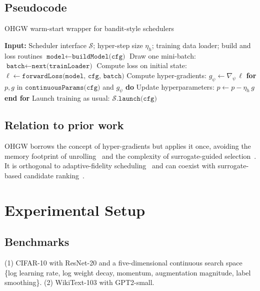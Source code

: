 \documentclass{article} %
\begin{document}
\subsection{Pseudocode}
\begin{algorithm}
\caption{OHGW warm-start wrapper for bandit-style schedulers}
\begin{algorithmic}
  \State{}\textbf{Input:} Scheduler interface \(\mathcal{S}\); hyper-step size \(\eta_h\); training data loader; build and loss routines%
    \State{}\(\texttt{model} \leftarrow \texttt{buildModel(cfg)}\)%
    \State{}Draw one mini-batch: \(\texttt{batch} \leftarrow \texttt{next(trainLoader)}\)%
    \State{}Compute loss on initial state: \(\ell \leftarrow \texttt{forwardLoss(model, cfg, batch)}\)%
    \State{}Compute hyper-gradients: \(g_{\psi} \leftarrow \nabla_{\psi} \, \ell\)%
    \State{}\textbf{for} \(p, g\) in \(\texttt{continuousParams(cfg)}\) and \(g_{\psi}\) \textbf{do}%
      \State{}\hspace{1em} Update hyperparameters: \(p \leftarrow p - \eta_h \, g\)%
    \State{}\textbf{end for}%
    \State{}Launch training as usual: \(\mathcal{S}.\texttt{launch(cfg)}\)%
  \EndFor%
\end{algorithmic}
\end{algorithm}

\subsection{Relation to prior work}
OHGW borrows the concept of hyper-gradients but applies it once, avoiding the memory footprint of unrolling~\cite{bertrand-2020-implicit} and the complexity of surrogate-guided selection~\cite{nguyen-2019-bayesian}. It is orthogonal to adaptive-fidelity scheduling~\cite{jiang-2024-efficient} and can coexist with surrogate-based candidate ranking~\cite{khazi-2023-deep}.

\section{Experimental Setup}\label{sec:experimental}
\subsection{Benchmarks}
(1) CIFAR-10 with ResNet-20 and a five-dimensional continuous search space \{log learning rate, log weight decay, momentum, augmentation magnitude, label smoothing\}. (2) WikiText-103 with GPT2-small.
\end{document}
